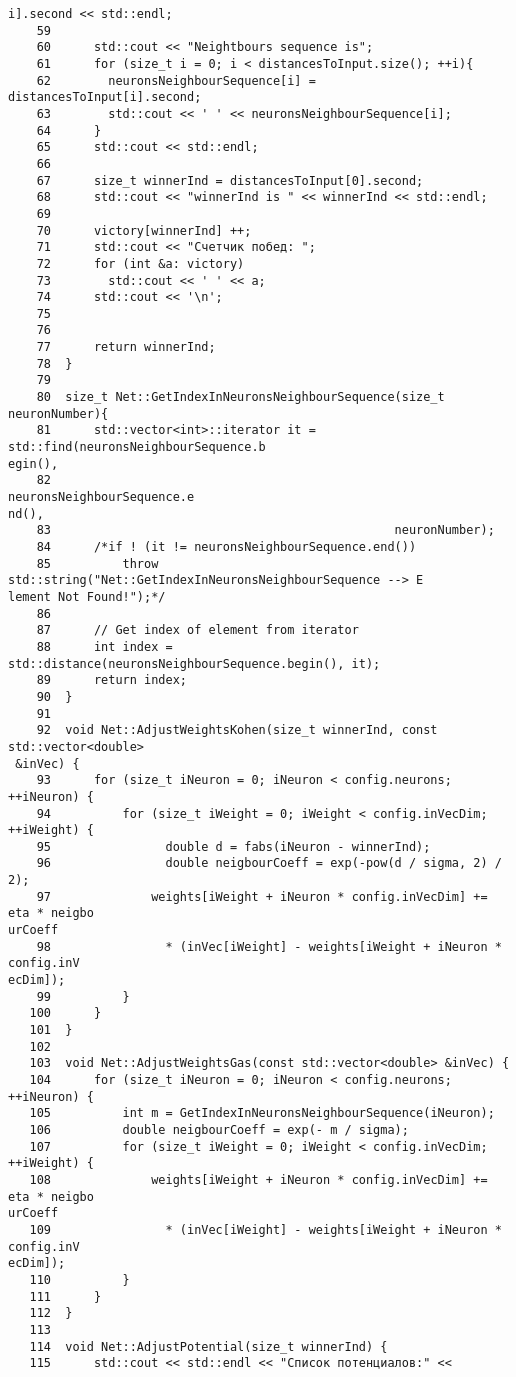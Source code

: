 \begin{verbatim}
i].second << std::endl;
    59	
    60	    std::cout << "Neightbours sequence is";
    61	    for (size_t i = 0; i < distancesToInput.size(); ++i){
    62	      neuronsNeighbourSequence[i] = distancesToInput[i].second;
    63	      std::cout << ' ' << neuronsNeighbourSequence[i];
    64	    }
    65	    std::cout << std::endl;
    66	
    67	    size_t winnerInd = distancesToInput[0].second;
    68	    std::cout << "winnerInd is " << winnerInd << std::endl;
    69	
    70	    victory[winnerInd] ++;
    71	    std::cout << "Счетчик побед: ";
    72	    for (int &a: victory)
    73	      std::cout << ' ' << a;
    74	    std::cout << '\n';
    75	
    76	    
    77	    return winnerInd;
    78	}
    79	
    80	size_t Net::GetIndexInNeuronsNeighbourSequence(size_t neuronNumber){
    81	    std::vector<int>::iterator it = std::find(neuronsNeighbourSequence.b
egin(), 
    82	                                              neuronsNeighbourSequence.e
nd(), 
    83	                                              neuronNumber);
    84	    /*if ! (it != neuronsNeighbourSequence.end())
    85	        throw std::string("Net::GetIndexInNeuronsNeighbourSequence --> E
lement Not Found!");*/
    86	
    87	    // Get index of element from iterator
    88	    int index = std::distance(neuronsNeighbourSequence.begin(), it);
    89	    return index;
    90	}
    91	
    92	void Net::AdjustWeightsKohen(size_t winnerInd, const std::vector<double>
 &inVec) {
    93	    for (size_t iNeuron = 0; iNeuron < config.neurons; ++iNeuron) {
    94	        for (size_t iWeight = 0; iWeight < config.inVecDim; ++iWeight) {
    95		          double d = fabs(iNeuron - winnerInd);
    96		          double neigbourCoeff = exp(-pow(d / sigma, 2) / 2);
    97	            weights[iWeight + iNeuron * config.inVecDim] += eta * neigbo
urCoeff 
    98	              * (inVec[iWeight] - weights[iWeight + iNeuron * config.inV
ecDim]);
    99	        }
   100	    }
   101	}
   102	
   103	void Net::AdjustWeightsGas(const std::vector<double> &inVec) {
   104	    for (size_t iNeuron = 0; iNeuron < config.neurons; ++iNeuron) {
   105	        int m = GetIndexInNeuronsNeighbourSequence(iNeuron);
   106	        double neigbourCoeff = exp(- m / sigma);
   107	        for (size_t iWeight = 0; iWeight < config.inVecDim; ++iWeight) {
   108	            weights[iWeight + iNeuron * config.inVecDim] += eta * neigbo
urCoeff 
   109	              * (inVec[iWeight] - weights[iWeight + iNeuron * config.inV
ecDim]);
   110	        }
   111	    }
   112	}
   113	
   114	void Net::AdjustPotential(size_t winnerInd) {
   115	    std::cout << std::endl << "Список потенциалов:" << 

\end{verbatim}
